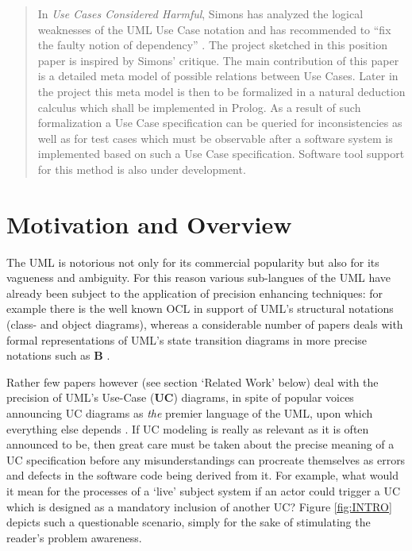 \date{Received: \today / Accepted: date}

\maketitle

\begin{abstract}
In \emph{Use Cases Considered Harmful}, Simons has analyzed 
the logical weaknesses of the UML Use Case notation and has 
recommended to ``fix the faulty notion of dependency'' \cite{Simons}. 
The project sketched in this position paper is inspired by 
Simons' critique. The main contribution of this paper is a 
detailed meta model of possible relations between Use Cases. 
Later in the project this meta model is then to be formalized 
in a natural deduction calculus which shall be implemented in 
{\sc Prolog}. As a result of such formalization a Use Case 
specification can be queried for inconsistencies as well as 
for test cases which must be observable after a software system 
is implemented based on such a Use Case specification. Software 
tool support for this method is also under development.
\end{abstract}

\section{Motivation and Overview}
\label{sec:intro}
The UML is notorious not only for its commercial popularity but also 
for its vagueness and ambiguity. For this reason various sub-langues 
of the UML have already been subject to the application of precision
enhancing techniques: for example there is the well known OCL in support 
of UML's structural notations (class- and object diagrams), whereas 
a considerable number of papers deals with formal representations 
of UML's state transition diagrams in more precise notations such 
as {\bf B} \cite{butler}.

Rather few papers however (see section `Related Work' below) 
deal with the precision of UML's Use-Case ({\bf UC}) diagrams, 
in spite of popular voices announcing UC diagrams as \emph{the} 
premier language of the UML, upon which everything else depends 
\cite{KGu04}. If UC modeling is really as relevant as it is often 
announced to be, then great care must be taken about the precise 
meaning of a UC specification before any misunderstandings can 
procreate themselves as errors and defects in the software code 
being derived from it. For example, what would it mean for the 
processes of a `live' subject system if an actor could trigger 
a UC which is designed as a mandatory inclusion of another UC? 
Figure \ref{fig:INTRO} depicts such a questionable scenario, 
simply for the sake of stimulating the reader's problem 
awareness.

